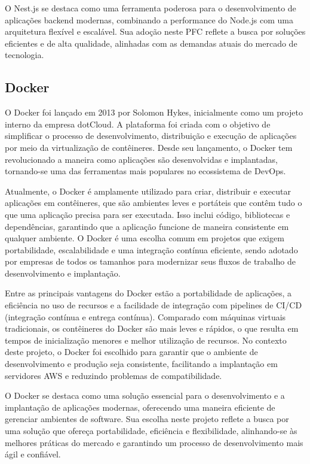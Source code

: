O Nest.js se destaca como uma ferramenta poderosa para o desenvolvimento de aplicações backend modernas, combinando a performance do Node.js com uma arquitetura flexível e escalável. Sua adoção neste \acrlong{PFC} reflete a busca por soluções eficientes e de alta qualidade, alinhadas com as demandas atuais do mercado de tecnologia.

\subsection{Docker}

O Docker foi lançado em 2013 por Solomon Hykes, inicialmente como um projeto interno da empresa dotCloud. A plataforma foi criada com o objetivo de simplificar o processo de desenvolvimento, distribuição e execução de aplicações por meio da virtualização de contêineres. Desde seu lançamento, o Docker tem revolucionado a maneira como aplicações são desenvolvidas e implantadas, tornando-se uma das ferramentas mais populares no ecossistema de DevOps.

Atualmente, o Docker é amplamente utilizado para criar, distribuir e executar aplicações em contêineres, que são ambientes leves e portáteis que contêm tudo o que uma aplicação precisa para ser executada. Isso inclui código, bibliotecas e dependências, garantindo que a aplicação funcione de maneira consistente em qualquer ambiente. O Docker é uma escolha comum em projetos que exigem portabilidade, escalabilidade e uma integração contínua eficiente, sendo adotado por empresas de todos os tamanhos para modernizar seus fluxos de trabalho de desenvolvimento e implantação.

Entre as principais vantagens do Docker estão a portabilidade de aplicações, a eficiência no uso de recursos e a facilidade de integração com pipelines de CI/CD (integração contínua e entrega contínua). Comparado com máquinas virtuais tradicionais, os contêineres do Docker são mais leves e rápidos, o que resulta em tempos de inicialização menores e melhor utilização de recursos. No contexto deste projeto, o Docker foi escolhido para garantir que o ambiente de desenvolvimento e produção seja consistente, facilitando a implantação em servidores AWS e reduzindo problemas de compatibilidade.

O Docker se destaca como uma solução essencial para o desenvolvimento e a implantação de aplicações modernas, oferecendo uma maneira eficiente de gerenciar ambientes de software. Sua escolha neste projeto reflete a busca por uma solução que ofereça portabilidade, eficiência e flexibilidade, alinhando-se às melhores práticas do mercado e garantindo um processo de desenvolvimento mais ágil e confiável.

